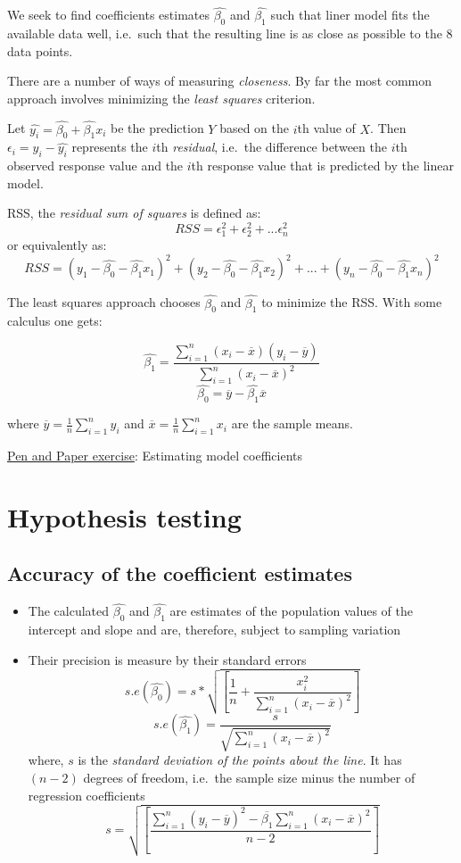 \documentclass[]{article}
\providecommand{\tightlist}{%
  \setlength{\itemsep}{0pt}\setlength{\parskip}{0pt}}
\begin{document}
We seek to find coefficients estimates \(\hat{\beta_0}\) and
\(\hat{\beta_1}\) such that liner model fits the available data well,
i.e.~such that the resulting line is as close as possible to the 8 data
points.

There are a number of ways of measuring \emph{closeness}. By far the
most common approach involves minimizing the \emph{least squares}
criterion.

Let \(\hat{y_i}=\hat{\beta_0} + \hat{\beta_1}x_i\) be the prediction
\(Y\) based on the \(i\)th value of \(X\). Then
\(\epsilon_i = y_i - \hat{y_i}\) represents the \(i\)th \emph{residual},
i.e.~the difference between the \(i\)th observed response value and the
\(i\)th response value that is predicted by the linear model.

RSS, the \emph{residual sum of squares} is defined as:
\[RSS = \epsilon_1^2 + \epsilon_2^2 + ... \epsilon_n^2\] or equivalently
as:
\[RSS=(y_1-\hat{\beta_0}-\hat{\beta_1}x_1)^2+(y_2-\hat{\beta_0}-\hat{\beta_1}x_2)^2+...+(y_n-\hat{\beta_0}-\hat{\beta_1}x_n)^2\]

The least squares approach chooses \(\hat{\beta_0}\) and
\(\hat{\beta_1}\) to minimize the RSS. With some calculus one gets:

\[\hat{\beta_1}= \frac{\sum_{i=1}^{n}(x_i-\overline{x})(y_i-\overline{y})}{\sum_{i=1}^{n}(x_i-\overline{x})^2}\]
\[\hat{\beta_0}=\overline{y}-\hat{\beta_1}\overline{x}\]

where \(\overline{y}=\frac{1}{n}\sum_{i=1}^{n}y_i\) and
\(\overline{x}=\frac{1}{n}\sum_{i=1}^{n}x_i\) are the sample means.

\href{pen-and-paper-plasma-volume.pdf}{Pen and Paper exercise}:
Estimating model coefficients

\hypertarget{hypothesis-testing}{%
\section{Hypothesis testing}\label{hypothesis-testing}}

\hypertarget{accuracy-of-the-coefficient-estimates}{%
\subsection{Accuracy of the coefficient
estimates}\label{accuracy-of-the-coefficient-estimates}}

\begin{itemize}
\tightlist
\item
  The calculated \(\hat{\beta_0}\) and \(\hat{\beta_1}\) are estimates
  of the population values of the intercept and slope and are,
  therefore, subject to sampling variation
\item
  Their precision is measure by their standard errors
  \[s.e(\hat{\beta_0})=s*\sqrt{[\frac{1}{n}+\frac{x_i^2}{\sum_{i=1}^{n}(x_i-\overline{x})^2}]}\]
  \[s.e(\hat{\beta_1})=\frac{s}{\sqrt{\sum_{i=1}^{n}(x_i-\overline{x})^2}}\]
  where, \(s\) is the \emph{standard deviation of the points about the
  line}. It has \((n-2)\) degrees of freedom, i.e.~the sample size minus
  the number of regression coefficients
  \[s=\sqrt{[\frac{\sum_{i=1}^{n}(y_i-\overline{y})^2-\overline{\beta_1}\sum_{i=1}^{n}(x_i-\overline{x})^2}{n-2}]}\]
\end{itemize}
\end{document}
